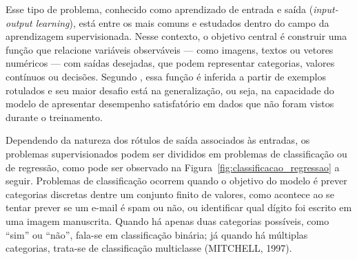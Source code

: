Esse tipo de problema, conhecido como aprendizado de entrada e saída (\textit{input-output learning}), está entre os mais comuns e estudados dentro do campo da aprendizagem supervisionada. Nesse contexto, o objetivo central é construir uma função que relacione variáveis observáveis — como imagens, textos ou vetores numéricos — com saídas desejadas, que podem representar categorias, valores contínuos ou decisões. Segundo \cite{russell_artificial_2016}, essa função é inferida a partir de exemplos rotulados e seu maior desafio está na generalização, ou seja, na capacidade do modelo de apresentar desempenho satisfatório em dados que não foram vistos durante o treinamento.

Dependendo da natureza dos rótulos de saída associados às entradas, os problemas supervisionados podem ser divididos em problemas de classificação ou de regressão, como pode ser observado na Figura~\ref{fig:classificacao_regressao} a seguir. Problemas de classificação ocorrem quando o objetivo do modelo é prever categorias discretas dentre um conjunto finito de valores, como acontece ao se tentar prever se um e-mail é spam ou não, ou identificar qual dígito foi escrito em uma imagem manuscrita. Quando há apenas duas categorias possíveis, como ``sim'' ou ``não'', fala-se em classificação binária; já quando há múltiplas categorias, trata-se de classificação multiclasse (MITCHELL, 1997).

\begin{figure}[h!]
		\centering
\end{figure}

